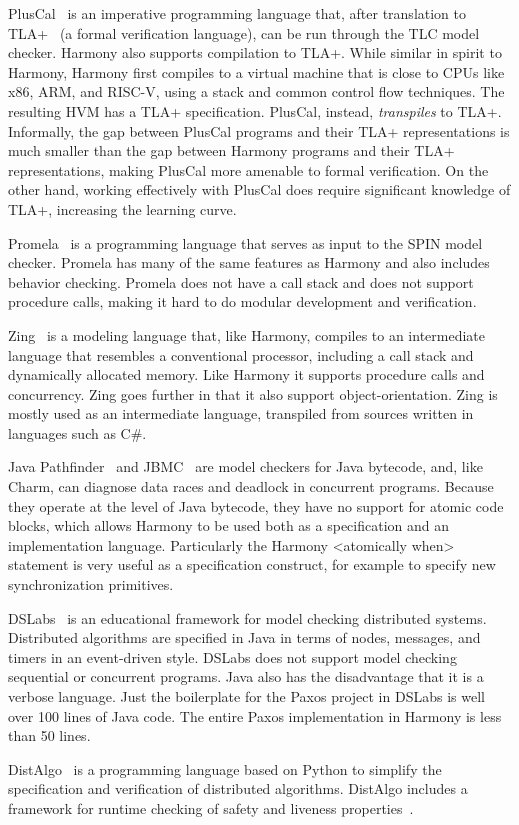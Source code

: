 \documentclass[twocolumn]{article}
\begin{document}
PlusCal~\cite{Lamport09} is an imperative programming language that,
after translation to TLA+~\cite{Lamport02} (a formal verification
language), can be run through the TLC model checker.  Harmony also
supports compilation to TLA+.  While similar in spirit to Harmony,
Harmony first compiles to a virtual machine that is close to CPUs
like x86, ARM, and RISC-V, using a stack and common control flow
techniques.  The resulting HVM has a TLA+ specification.  PlusCal,
instead, \emph{trans\-piles} to TLA+.  Informally, the gap between
PlusCal programs and their TLA+ representations is much smaller
than the gap between Harmony programs and their TLA+ representations,
making PlusCal more amenable to formal verification.  On the other
hand, working effectively with PlusCal does require significant
knowledge of TLA+, increasing the learning curve.

Promela~\cite{SPIN} is a programming language that serves as input
to the SPIN model checker.  Promela has many of the same features
as Harmony and also includes behavior checking.  Promela
does not have a call stack and does not support procedure calls,
making it hard to do modular development and verification.

Zing~\cite{Zing} is a modeling language that, like Harmony, compiles to an
intermediate language that resembles a conventional processor,
including a call stack and dynamically allocated memory.  Like
Harmony it supports procedure calls and concurrency.  Zing goes
further in that it also support object-orientation.  Zing is
mostly used as an intermediate language, transpiled from sources
written in languages such as C\#.

Java Pathfinder~\cite{Pathfinder} and JBMC~\cite{JBMC} are model
checkers for Java bytecode, and,
like Charm, can diagnose data races and deadlock in concurrent
programs.  Because they operate at the level of Java bytecode, they
have no support for atomic code blocks, which allows Harmony to be
used both as a specification and an implementation language.
Particularly the Harmony <{atomically when}> statement is very
useful as a specification construct, for example to specify new
synchronization primitives.

DSLabs~\cite{MWA19} is an educational framework for model checking distributed
systems.  Distributed algorithms are specified in Java in terms of
nodes, messages, and timers in an event-driven style.  DSLabs does not
support model checking sequential or concurrent programs.  Java
also has the disadvantage that it is a verbose language.  Just the
boilerplate for the Paxos project in DSLabs is well over 100 lines
of Java code.  The entire Paxos implementation in Harmony is less
than 50 lines.

Dist\-Algo~\cite{DistAlgo} is a programming language based on Python to
simplify the specification and verification of distributed algorithms.
Dist\-Algo includes a framework for runtime checking of safety and liveness
properties~\cite{LS20}.



\end{document}
